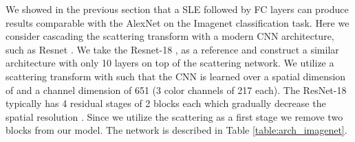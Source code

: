 \documentclass[10pt,twocolumn,letterpaper]{article}
\begin{document}
We showed in the previous section that a SLE followed by FC layers can produce results comparable with the AlexNet \cite{krizhevsky2012imagenet} on the Imagenet classification task. Here we consider cascading the scattering transform with a modern CNN architecture, such as Resnet \cite{zagoruyko2016wide,he2015deep}. We take the Resnet-18 \cite{zagoruyko2016wide}, as a reference and construct a similar architecture with only 10 layers on top of the scattering network.  We utilize a scattering transform with  such that the CNN is learned over a spatial dimension of  and a channel dimension of 651 (3 color channels of 217 each). The ResNet-18 typically has 4 residual stages of 2 blocks each which gradually decrease the spatial resolution \cite{zagoruyko2016wide}. Since we utilize the scattering as a first stage we remove two blocks from our model. The network is described in Table \ref{table:arch_imagenet}.
\end{document}
